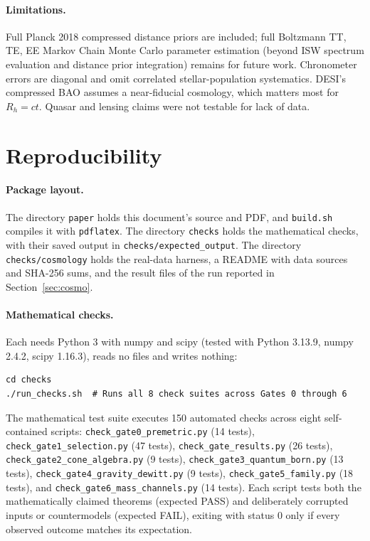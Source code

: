 \documentclass[11pt]{article}
\theoremstyle{definition}
\theoremstyle{remark}
\begin{document}
\paragraph{Limitations.} Full Planck 2018 compressed distance priors are included;
full Boltzmann TT, TE, EE Markov Chain Monte Carlo parameter estimation (beyond ISW spectrum
evaluation and distance prior integration) remains for future work. Chronometer errors are diagonal
and omit correlated stellar-population systematics. DESI's compressed BAO assumes a near-fiducial
cosmology, which matters most for $R_h=ct$. Quasar and lensing claims were not testable for lack of data.

\appendix
\section{Reproducibility}
\label{app:repro}
\small\sloppy

\paragraph{Package layout.} The directory \texttt{paper} holds this document's source
and PDF, and \texttt{build.sh} compiles it with \texttt{pdflatex}. The directory
\texttt{checks} holds the mathematical checks, with their saved output in
\texttt{checks/expected\_output}. The directory \texttt{checks/cosmology} holds the
real-data harness, a README with data sources and SHA-256 sums, and the result files of
the run reported in Section~\ref{sec:cosmo}.

\paragraph{Mathematical checks.} Each needs Python 3 with numpy and scipy (tested with
Python 3.13.9, numpy 2.4.2, scipy 1.16.3), reads no files and writes nothing:
\begin{verbatim}
cd checks
./run_checks.sh  # Runs all 8 check suites across Gates 0 through 6
\end{verbatim}
The mathematical test suite executes 150 automated checks across eight self-contained scripts:
\texttt{check\_gate0\_premetric.py} (14 tests),
\texttt{check\_gate1\_selection.py} (47 tests),
\texttt{check\_gate\_results.py} (26 tests),
\texttt{check\_gate2\_cone\_algebra.py} (9 tests),
\texttt{check\_gate3\_quantum\_born.py} (13 tests),
\texttt{check\_gate4\_gravity\_dewitt.py} (9 tests),
\texttt{check\_gate5\_family.py} (18 tests), and
\texttt{check\_gate6\_mass\_channels.py} (14 tests).
Each script tests both the mathematically claimed theorems (expected PASS) and deliberately
corrupted inputs or countermodels (expected FAIL), exiting with status 0 only if every
observed outcome matches its expectation.
\end{document}
